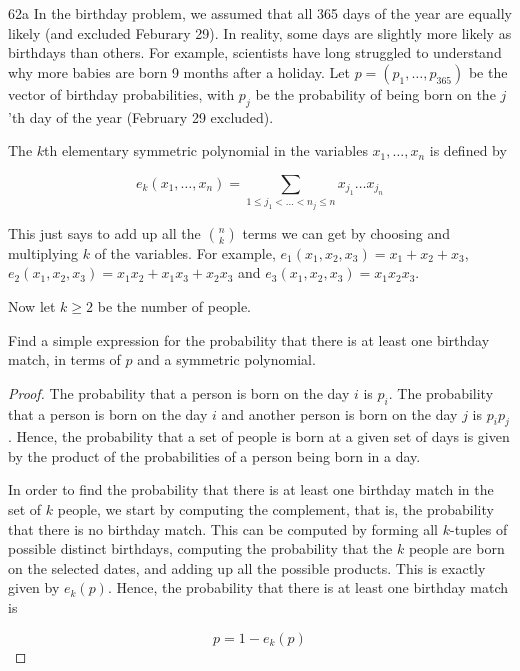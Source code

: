 \begin{exercise}{62a}
In the birthday problem, we assumed that all 365 days of the year are equally likely (and excluded Feburary 29). In reality, some days are slightly more likely as birthdays than others. For example, scientists have long struggled to understand why more babies are born 9 months after a holiday. Let $p = (p_1, \dots, p_{365})$ be the vector of birthday probabilities, with $p_j$ be the probability of being born on the $j$'th day of the year (February 29 excluded).

The $k$th elementary symmetric polynomial in the variables $x_1, \dots, x_n$ is defined by

$$e_k(x_1, \dots, x_n) = \sum_{1 \leq j_1 < \dots < n_j \leq n} x_{j_1}\dots x_{j_n} $$

This just says to add up all the $n \choose k$ terms we can get by choosing and multiplying $k$ of the variables. For example, $e_1(x_1, x_2, x_3) = x_1+x_2+x_3$, $e_2(x_1, x_2, x_3) = x_1x_2 + x_1x_3 + x_2x_3$ and $e_3(x_1,x_2,x_3)=x_1x_2x_3$. 

Now let $k \geq 2$ be the number of people.

Find a simple expression for the probability that there is at least one birthday match, in terms of $p$ and a symmetric polynomial.
\end{exercise}

\begin{proof}
    The probability that a person is born on the day $i$ is $p_i$. The probability that a person is born on the day $i$ and another person is born on the day $j$ is $p_ip_j$. Hence, the probability that a set of people is born at a given set of days is given by the product of the probabilities of a person being born in a day.

    In order to find the probability that there is at least one birthday match in the set of $k$ people, we start by computing the complement, that is, the probability that there is no birthday match. This can be computed by forming all $k$-tuples of possible distinct birthdays, computing the probability that the $k$ people are born on the selected dates, and adding up all the possible products. This is exactly given by $e_k(p)$. Hence, the probability that there is at least one birthday match is

    $$p = 1 - e_k(p)$$
\end{proof}

